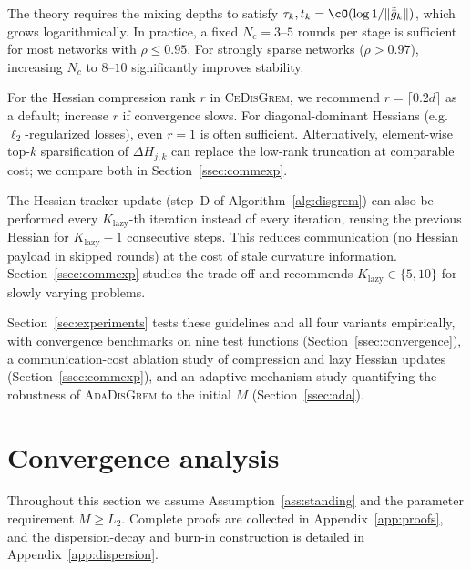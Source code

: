 \documentclass[review,onefignum,onetabnum]{siamart171218}
\begin{document}
	The theory requires the mixing depths to satisfy
	$\tau_k, t_k = \cO(\log 1/\|\tilde{\bar g}_k\|)$, which grows
	logarithmically. In practice, a fixed $N_c = 3$--$5$ rounds per stage is sufficient
	for most networks with $\rho \le 0.95$.
	For strongly sparse networks ($\rho > 0.97$), increasing $N_c$ to $8$--$10$
	significantly improves stability.

	For the Hessian compression rank $r$ in \textsc{CeDisGrem},
	we recommend $r = \lceil 0.2d \rceil$ as a default; increase $r$ if convergence slows.
	For diagonal-dominant Hessians (e.g.\ $\ell_2$-regularized losses), even $r=1$
	is often sufficient.
	Alternatively, element-wise top-$k$ sparsification of $\Delta H_{j,k}$
	can replace the low-rank truncation at comparable cost; we compare both in
	Section~\ref{ssec:commexp}.

	The Hessian tracker update (step~D of Algorithm~\ref{alg:disgrem}) can also be
	performed every $K_{\mathrm{lazy}}$-th iteration instead of every iteration,
	reusing the previous Hessian for $K_{\mathrm{lazy}}{-}1$ consecutive steps.
	This reduces communication (no Hessian payload in skipped rounds) at the cost
	of stale curvature information.
	Section~\ref{ssec:commexp} studies the trade-off and recommends
	$K_{\mathrm{lazy}}\in\{5,10\}$ for slowly varying problems.
	
	Section~\ref{sec:experiments} tests these guidelines and all four
	variants empirically, with convergence benchmarks on nine test functions
	(Section~\ref{ssec:convergence}), a communication-cost ablation study
	of compression and lazy Hessian updates (Section~\ref{ssec:commexp}),
	and an adaptive-mechanism study quantifying the robustness of
	\textsc{AdaDisGrem} to the initial $M$ (Section~\ref{ssec:ada}).
	
	
\section{Convergence analysis}\label{sec:theory}
Throughout this section we assume Assumption~\ref{ass:standing}
and the parameter requirement $M\ge L_2$.
Complete proofs are collected in Appendix~\ref{app:proofs}, and the
dispersion-decay and burn-in construction is detailed in
Appendix~\ref{app:dispersion}.
\end{document}
